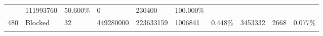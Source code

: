 \documentclass[11pt]{article}
\begin{document}
\begin{longtable}[]{@{}llllllllll@{}}
\begin{minipage}[t]{0.06\columnwidth}
\end{minipage} & \begin{minipage}[t]{0.07\columnwidth}\raggedright\strut
111993760\strut
\end{minipage} & \begin{minipage}[t]{0.07\columnwidth}\raggedright\strut
50.600\%\strut
\end{minipage} & \begin{minipage}[t]{0.06\columnwidth}\raggedright\strut
0\strut
\end{minipage} & \begin{minipage}[t]{0.07\columnwidth}\raggedright\strut
230400\strut
\end{minipage} & \begin{minipage}[t]{0.07\columnwidth}\raggedright\strut
100.000\%\strut
\end{minipage}\tabularnewline
\begin{minipage}[t]{0.09\columnwidth}\raggedright\strut
480\strut
\end{minipage} & \begin{minipage}[t]{0.06\columnwidth}\raggedright\strut
Blocked\strut
\end{minipage} & \begin{minipage}[t]{0.09\columnwidth}\raggedright\strut
32\strut
\end{minipage} & \begin{minipage}[t]{0.07\columnwidth}\raggedright\strut
449280000\strut
\end{minipage} & \begin{minipage}[t]{0.06\columnwidth}\raggedright\strut
223633159\strut
\end{minipage} & \begin{minipage}[t]{0.07\columnwidth}\raggedright\strut
1006841\strut
\end{minipage} & \begin{minipage}[t]{0.07\columnwidth}\raggedright\strut
0.448\%\strut
\end{minipage} & \begin{minipage}[t]{0.06\columnwidth}\raggedright\strut
3453332\strut
\end{minipage} & \begin{minipage}[t]{0.07\columnwidth}\raggedright\strut
2668\strut
\end{minipage} & \begin{minipage}[t]{0.07\columnwidth}\raggedright\strut
0.077\%\strut
\end{minipage}\tabularnewline
\begin{minipage}[t]{0.09\columnwidth}\raggedright\strut

\end{minipage}
\end{longtable}
\end{document}
